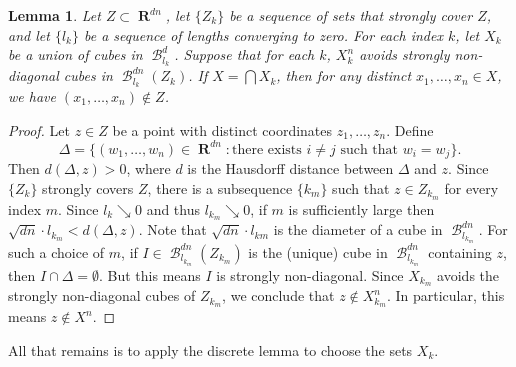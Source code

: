 \documentclass[dvipsnames,letterpaper,12pt]{article}
\numberwithin{equation}{section}
\theoremstyle{plain}
\newtheorem{lemma}{Lemma}
\theoremstyle{remark}
\DeclareMathOperator{\RR}{\mathbf{R}}
\DeclareMathOperator{\B}{\mathcal{B}}
\begin{document}
\begin{lemma} \label{stronglydiagonal}
	Let $Z \subset \RR^{dn}$, let $\{Z_k\}$ be a sequence of sets that strongly cover $Z$, and let $\{ l_k \}$ be a sequence of lengths converging to zero. For each index $k$, let $X_k$ be a union of cubes in $\B^d_{l_k}$. Suppose that for each $k$, $X_k^n$ avoids strongly non-diagonal cubes in $\B^{dn}_{l_k}(Z_k)$. If $X = \bigcap X_k$, then for any distinct $x_1, \dots, x_n \in X$, we have $(x_1, \dots, x_n) \not \in Z$.
\end{lemma}
\begin{proof}
	Let $z \in Z$ be a point with distinct coordinates $z_1, \dots, z_n$. Define
	\[ \Delta = \{ (w_1, \dots, w_n) \in \RR^{dn}: \text{there exists $i \neq j$ such that $w_i = w_j$} \}. \]
	Then $d(\Delta,z) > 0$, where $d$ is the Hausdorff distance between $\Delta$ and $z$. Since $\{ Z_k \}$ strongly covers $Z$, there is a subsequence $\{ k_m \}$ such that $z \in Z_{k_m}$ for every index $m$. Since $l_k \searrow 0$ and thus $l_{k_m}\searrow 0$, if $m$ is sufficiently large then $\sqrt{dn} \cdot l_{k_m} < d(\Delta,z)$. Note that $\sqrt{dn} \cdot l_{km}$ is the diameter of a cube in $\B_{l_{k_m}}^{dn}$. For such a choice of $m$, if $I\in \B_{l_{k_m}}^{dn}(Z_{k_m})$ is the (unique) cube in $\B_{l_{k_m}}^{dn}$ containing $z$, then $I \cap \Delta = \emptyset$. But this means $I$ is strongly non-diagonal. Since $X_{k_m}$ avoids the strongly non-diagonal cubes of $Z_{k_m}$, we conclude that $z \not \in X_{k_m}^n$. In particular, this means $z \not\in X^n$.
\end{proof}

All that remains is to apply the discrete lemma to choose the sets $X_k$.
\end{document}
